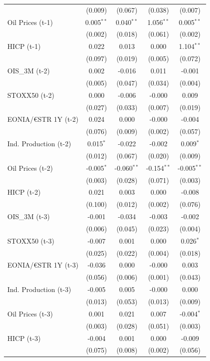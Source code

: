 \begin{longtable}[t]{lcccc}
 & (0.009) & (0.067) & (0.038) & (0.007)\\
Oil Prices (t-1) & 0.005$^{**}$ & 0.040$^{**}$ & 1.056$^{**}$ & 0.005$^{**}$\\
 & (0.002) & (0.018) & (0.061) & (0.002)\\
HICP (t-1) & 0.022 & 0.013 & 0.000 & 1.104$^{**}$\\
 & (0.097) & (0.019) & (0.005) & (0.072)\\
OIS\_3M (t-2) & 0.002 & -0.016 & 0.011 & -0.001\\
 & (0.005) & (0.047) & (0.034) & (0.004)\\
STOXX50 (t-2) & 0.000 & -0.006 & -0.000 & 0.009\\
 & (0.027) & (0.033) & (0.007) & (0.019)\\
EONIA/€STR 1Y (t-2) & 0.024 & 0.000 & -0.000 & -0.004\\
 & (0.076) & (0.009) & (0.002) & (0.057)\\
Ind. Production (t-2) & 0.015$^{*}$ & -0.022 & -0.002 & 0.009$^{*}$\\
 & (0.012) & (0.067) & (0.020) & (0.009)\\
Oil Prices (t-2) & -0.005$^{*}$ & -0.060$^{**}$ & -0.154$^{**}$ & -0.005$^{**}$\\
 & (0.003) & (0.028) & (0.071) & (0.003)\\
HICP (t-2) & 0.021 & 0.003 & 0.000 & -0.008\\
 & (0.100) & (0.012) & (0.002) & (0.076)\\
OIS\_3M (t-3) & -0.001 & -0.034 & -0.003 & -0.002\\
 & (0.006) & (0.045) & (0.023) & (0.004)\\
STOXX50 (t-3) & -0.007 & 0.001 & 0.000 & 0.026$^{*}$\\
 & (0.025) & (0.022) & (0.004) & (0.018)\\
EONIA/€STR 1Y (t-3) & -0.036 & 0.000 & -0.000 & 0.003\\
 & (0.056) & (0.006) & (0.001) & (0.043)\\
Ind. Production (t-3) & -0.005 & 0.005 & -0.000 & 0.000\\
 & (0.013) & (0.053) & (0.013) & (0.009)\\
Oil Prices (t-3) & 0.001 & 0.021 & 0.007 & -0.004$^{*}$\\
 & (0.003) & (0.028) & (0.051) & (0.003)\\
HICP (t-3) & -0.004 & 0.001 & 0.000 & -0.009\\
 & (0.075) & (0.008) & (0.002) & (0.056)\\

\end{longtable}
